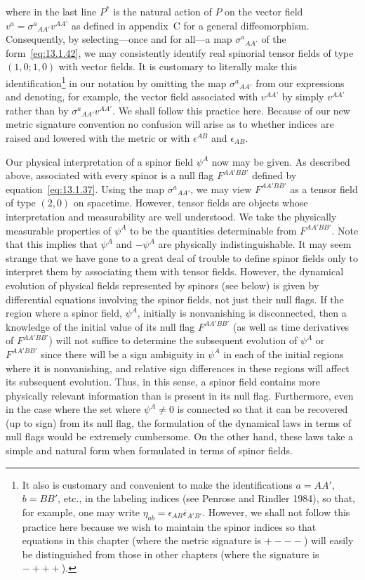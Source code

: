 where in the last line \(P^*\) is the natural action of \(P\) on the vector field
\(v^a=\sigma^a{}_{AA'}v^{AA'}\) as defined in appendix~C for a general
diffeomorphism. Consequently, by selecting---once and for all---a map
\(\sigma^a{}_{AA'}\) of the form~\eqref{eq:13.1.42}, we may consistently identify
real spinorial tensor fields of type \((1,0;1,0)\) with vector fields. It is customary
to literally make this identification\footnote{It also is customary and convenient
to make the identifications \(a=AA'\), \(b=BB'\), etc., in the labeling indices (see
Penrose and Rindler 1984), so that, for example, one may write
\(\eta_{ab}=\epsilon_{AB}\overline\epsilon_{A'B'}\). However, we shall not follow
this practice here because we wish to maintain the spinor indices so that equations
in this chapter (where the metric signature is \(+---\)) will easily be distinguished
from those in other chapters (where the signature is \(-+++\)).} in our notation by
omitting the map \(\sigma^a{}_{AA'}\) from our expressions and denoting, for example,
the vector field associated with \(v^{AA'}\) by simply \(v^{AA'}\) rather than by
\(\sigma^a{}_{AA'}v^{AA'}\). We shall follow this practice here. Because of our new
metric signature convention no confusion will arise as to whether indices are raised
and lowered with the metric or with \(\epsilon^{AB}\) and \(\epsilon_{AB}\).

Our physical interpretation of a spinor field \(\psi^A\) now may be given. As
described above, associated with every spinor is a null flag \(F^{AA'BB'}\) defined
by equation~\eqref{eq:13.1.37}. Using the map \(\sigma^a{}_{AA'}\), we may view
\(F^{AA'BB'}\) as a tensor field of type \((2,0)\) on spacetime. However, tensor
fields are objects whose interpretation and measurability are well understood. We
take the physically measurable properties of \(\psi^A\) to be the quantities
determinable from \(F^{AA'BB'}\). Note that this implies that \(\psi^A\) and
\(-\psi^A\) are physically indistinguishable. It may seem strange that we have gone
to a great deal of trouble to define spinor fields only to interpret them by
associating them with tensor fields. However, the dynamical evolution of physical
fields represented by spinors (see below) is given by differential equations
involving the spinor fields, not just their null flags. If the region where a spinor
field, \(\psi^A\), initially is nonvanishing is disconnected, then a knowledge of the
initial value of its null flag \(F^{AA'BB'}\) (as well as time derivatives of
\(F^{AA'BB'}\)) will not suffice to determine the subsequent evolution of \(\psi^A\)
or \(F^{AA'BB'}\) since there will be a sign ambiguity in \(\psi^A\) in each of the
initial regions where it is nonvanishing, and relative sign differences in these
regions will affect its subsequent evolution. Thus, in this sense, a spinor field
contains more physically relevant information than is present in its null flag.
Furthermore, even in the case where the set where \(\psi^A\ne0\) is connected so
that it can be recovered (up to sign) from its null flag, the formulation of the
dynamical laws in terms of null flags would be extremely cumbersome. On the other
hand, these laws take a simple and natural form when formulated in terms of spinor
fields.

